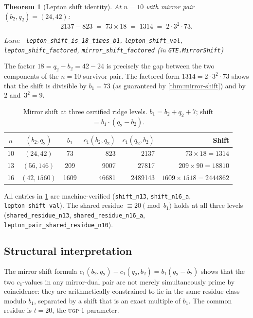 \documentclass[11pt,a4paper]{article}
\newenvironment{leanref}%
  {\par\smallskip\noindent\begingroup\raggedright\textup{Lean:}~}%
  {\par\endgroup}
\newtheorem{theorem}{Theorem}[section]
\theoremstyle{definition}
\newcommand{\ugp}{\textsc{ugp}}
\begin{document}
\begin{theorem}[Lepton shift identity]\label{thm:lepton-shift}
At $n = 10$ with mirror pair $(b_2, q_2) = (24, 42)$:
\[
  2137 - 823 \;=\; 73 \times 18 \;=\; 1314 \;=\; 2 \cdot 3^2 \cdot 73.
\]

\begin{leanref} \lstinline|lepton_shift_is_18_times_b1|,
\lstinline|lepton_shift_val|,
\lstinline|lepton_shift_factored|,
\lstinline|mirror_shift_factored| \textup{(in \texttt{GTE.MirrorShift})}
\end{leanref}
\end{theorem}

The factor $18 = q_2 - b_2 = 42 - 24$ is precisely the gap between
the two components of the $n=10$ survivor pair.  The factored form
$1314 = 2 \cdot 3^2 \cdot 73$ shows that the shift is divisible by
$b_1 = 73$ (as guaranteed by \cref{thm:mirror-shift}) and by~$2$
and~$3^2 = 9$.

\begin{table}[ht]
\centering
\caption{Mirror shift at three certified ridge levels.
$b_1 = b_2 + q_2 + 7$; shift $= b_1 \cdot (q_2 - b_2)$.}
\label{tab:mirror-shift}
\begin{tabular}{@{}cccrrr@{}}
\toprule
$n$ & $(b_2, q_2)$ & $b_1$ & $c_1(b_2,q_2)$ & $c_1(q_2,b_2)$ & Shift \\
\midrule
10 & $(24, 42)$    & 73   & 823    & 2137   & $73 \times 18 = 1314$ \\
13 & $(56, 146)$   & 209  & 9007   & 27817  & $209 \times 90 = 18810$ \\
16 & $(42, 1560)$  & 1609 & 46681  & 2489143 & $1609 \times 1518 = 2444862$ \\
\bottomrule
\end{tabular}
\end{table}

All entries in \cref{tab:mirror-shift} are machine-verified
(\lstinline|shift_n13|, \lstinline|shift_n16_a|,
\lstinline|lepton_shift_val|).
The shared residue $\equiv 20 \pmod{b_1}$ holds at all three levels
(\lstinline|shared_residue_n13|,
\lstinline|shared_residue_n16_a|,
\lstinline|lepton_pair_shared_residue_n10|).

\subsection{Structural interpretation}

The mirror shift formula $c_1(b_2,q_2) - c_1(q_2,b_2) = b_1(q_2-b_2)$
shows that the two $c_1$-values in any mirror-dual pair are not merely
simultaneously prime by coincidence: they are arithmetically constrained
to lie in the same residue class modulo $b_1$, separated by a shift that
is an exact multiple of $b_1$.  The common residue is $t = 20$, the
\ugp{}-1 parameter.
\end{document}
